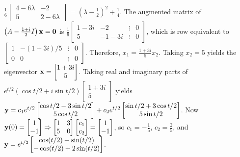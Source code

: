 \documentclass{ximera}
\begin{document}
\begin{problem}
\begin{solution}
    $\frac{1}{6}\begin{vmatrix}4-6\lambda&-2\\5&2-6\lambda
\end{vmatrix}= \left(\lambda-
\frac{1}{2}\right)^2+\frac{1}{4}$.
The augmented matrix of
$ \left(A-\frac{1+i}{2}I\right){\bf x}={\bf 0}$ is
$\frac{1}{6} \begin{bmatrix}1-3i&-2&\vdots&0\\5&-1-3i&\vdots&0
 \end{bmatrix}$, which is row equivalent to
$ \begin{bmatrix} 1&-(1+3i)/5&\vdots&0\\ 0&0&\vdots&0
 \end{bmatrix}$. Therefore,  $x_1=\frac{1+3i}{5}x_2$. Taking
$x_2=5$ yields the eigenvector
${\bf x}= \begin{bmatrix}1+3i\\5 \end{bmatrix}$.
 Taking real and imaginary parts of
$e^{t/2}(\cos t/2+i\sin
t/2) \begin{bmatrix}1+3i\\5 \end{bmatrix}$
yields ${\bf y}= c_1e^{t/2}\begin{bmatrix}\cos t/2-3\sin t/2\\5\cos t/2 \end{bmatrix}
+c_2e^{t/2}\begin{bmatrix}\sin t/2+3\cos t/2\\5\sin t/2 \end{bmatrix}$. Now ${\bf
y}(0)=\begin{bmatrix}1\\-1 \end{bmatrix}\Rightarrow
\begin{bmatrix}1&3\\5&0 \end{bmatrix}\begin{bmatrix}c_1\\c_2 \end{bmatrix}=\begin{bmatrix}1\\-1 \end{bmatrix}$, so
$c_1=-\frac{1}{5}$,
$c_2=\frac{2}{5}$, and
${\bf y}= e^{t/2} \begin{bmatrix}\cos(t/2)+
\sin(t/2)\\-\cos(t/2)+2\sin(t/2)
 \end{bmatrix}$.
\end{solution}
\end{problem}
\end{document}
